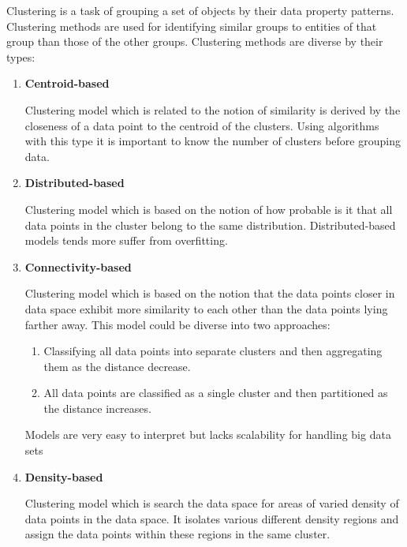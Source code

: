 Clustering is a task of grouping a set of objects by their data property patterns. Clustering methods are used for identifying similar groups to entities of that group than those of the other groups. Clustering methods are diverse by their types:
\begin{enumerate}
    \item \textbf{Centroid-based}
    
    Clustering model which is related to the notion of similarity is derived by the closeness of a data point to the centroid of the clusters. Using algorithms with this type it is important to know the number of clusters before grouping data.
    
    \item \textbf{Distributed-based}
    
    Clustering model which is based on the notion of how probable is it that all data points in the cluster belong to the same distribution. Distributed-based models tends more suffer from overfitting. 
    
    \item \textbf{Connectivity-based}
    
    Clustering model which is based on the notion that the data points closer in data space exhibit more similarity to each other than the data points lying farther away. This model could be diverse into two approaches:
    \begin{enumerate}
        \item Classifying all data points into separate clusters and then aggregating them as the distance decrease.
        \item All data points are classified as a single cluster and then partitioned as the distance increases.
    \end{enumerate}
    Models are very easy to interpret but lacks scalability for handling big data sets
    
    \item \textbf{Density-based}
    
    Clustering model which is search the data space for areas of varied density of data points in the data space. It isolates various different density regions and assign the data points within these regions in the same cluster.
    
\end{enumerate}


